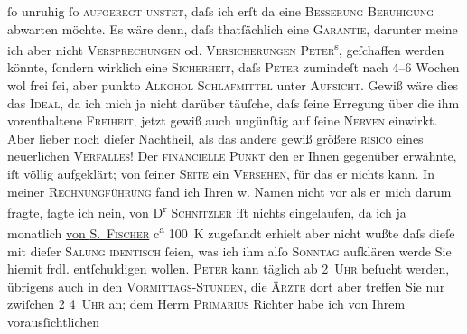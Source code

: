 \begin{ledgroupsized}[t]{13cm}
                    ſo unruhig ſo \textsc{aufgeregt}{ }{\kaufmannsund}{ }\textsc{unstet}, daſs ich erſt da eine \textsc{Beſſerung}{ }{\kaufmannsund}{ }\textsc{Beruhigung} abwarten möchte.\pend
           \pstart
           Es wäre denn, daſs thatſächlich eine \textsc{Garantie}, darunter
                    meine ich aber nicht \textsc{Versprechungen} od. \textsc{Versicherungen}{ }\textsc{Peter}\textsuperscript{s}, geſchaffen werden {\pb}könnte, ſondern wirklich eine \textsc{Sicherheit}, daſs \textsc{Peter} zumindeſt nach 4–6 Wochen wol frei ſei, aber punkto \textsc{Alkohol}{ }{\kaufmannsund}{ }\textsc{Schlafmittel} unter \textsc{Aufsicht}.\pend
           \pstart
           Gewiß wäre dies das \textsc{Ideal}, da ich mich ja nicht darüber
                    täuſche, daſs ſeine Erregung über die ihm vorenthaltene \textsc{Freiheit}, jetzt gewiß auch ungünſtig auf ſeine \textsc{Nerven} einwirkt.\pend
           \pstart
           Aber lieber noch dieſer {\pb}Nachtheil, als das andere
                        {\kaufmannsund} gewiß größere \textsc{risico} eines neuerlichen \textsc{Verfalles}!\pend
           \pstart
           Der \textsc{financielle Punkt} den er Ihnen gegenüber erwähnte,
                    iſt völlig aufgeklärt; von ſeiner \textsc{Seite} ein \textsc{Versehen}, für das er nichts kann. In meiner \textsc{Rechnungführung} fand ich Ihren w. Namen nicht vor {\kaufmannsund} als er mich darum fragte, ſagte ich nein, von
                        D\textsuperscript{r}{ }\textsc{Schnitzler}{ }{\pb}iſt nichts eingelaufen, da ich ja monatlich \uline{von \textsc{S. Fischer}} c\textsuperscript{a} 100 K zugeſandt erhielt aber nicht wußte
                    daſs dieſe mit dieſer \textsc{Sa{\geminationm}lung
                        identisch} ſeien, was ich ihm alſo \textsc{Sonntag} aufklären werde {\kaufmannsund} Sie hiemit frdl.
                    entſchuldigen wollen.\pend
           \pstart
           \textsc{Peter} kann täglich ab 2 \textsc{Uhr} beſucht werden, übrigens
                    auch in den \textsc{Vormittags-Stunden}, die \textsc{Ärzte} dort aber {\pb}treffen Sie nur zwiſchen 2 {\kaufmannsund} 4 \textsc{Uhr} an; dem Herrn \textsc{Primarius}{ }Richter habe ich von Ihrem vorausſichtlichen

\end{ledgroupsized}

